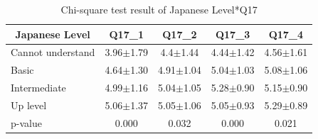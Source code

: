 \begin{table}[h]
  \caption{Chi-square test result of Japanese Level*Q17}
  \label{table32d}
  \centering
  \begin{tabular}{l|cccc}
 \hline
        \multicolumn{1}{c|}{Japanese Level}          & Q17\_1               & Q17\_2 & Q17\_3    & Q17\_4        \\
\hline
Cannot understand & 3.96$\pm$1.79& 4.4$\pm$1.44 & 4.44$\pm$1.42 & 4.56$\pm$1.61 \\
Basic             & 4.64$\pm$1.30 & 4.91$\pm$1.04 & 5.04$\pm$1.03  & 5.08$\pm$1.06  \\
Intermediate      & 4.99$\pm$1.16 & 5.04$\pm$1.05 & 5.28$\pm$0.90 & 5.15$\pm$0.90  \\
Up level          & 5.06$\pm$1.37& 5.05$\pm$1.06 & 5.05$\pm$0.93 & 5.29$\pm$0.89 \\        
\hline
p-value&           0.000&         0.032&         0.000&   0.021   \\
 \hline
  \end{tabular}
\end{table}

